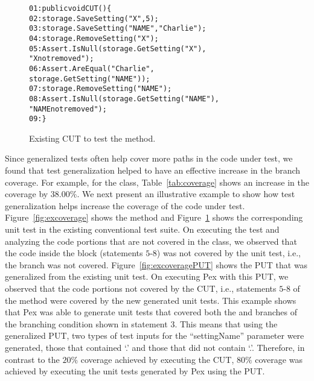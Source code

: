 \begin{figure}[t]
\begin{CodeOut}
\begin{alltt}
01: public void CUT() \{
02: \hspace*{0.07in}storage.SaveSetting("X",5);
03: \hspace*{0.07in}storage.SaveSetting("NAME","Charlie");
04: \hspace*{0.07in}storage.RemoveSetting("X");
05: \hspace*{0.07in}Assert.IsNull(storage.GetSetting("X"),
\hspace*{1.0in}"X not removed");
06: \hspace*{0.07in}Assert.AreEqual("Charlie", 
\hspace{1.0in}storage.GetSetting( "NAME" ) );
07: \hspace*{0.07in}storage.RemoveSetting("NAME");
08: \hspace*{0.07in}Assert.IsNull( storage.GetSetting("NAME"), 
\hspace*{1.8in}"NAME not removed" ); 
09: \hspace*{0.02in}\}
\end{alltt}
\end{CodeOut}  \vspace*{-3ex}
\caption{Existing CUT to test the  method.} \vspace*{-2ex}
\label{fig:excoveragetest}%
\end{figure}

Since generalized tests often help cover more paths in the code under test, we found that test generalization helped to have an effective increase in the branch coverage. For example, for the  class, Table~\ref{tab:coverage} shows an increase in the coverage by $38.00\%$. We next present an illustrative example to show how test generalization helps increase the coverage of the code under test. Figure~\ref{fig:excoverage} shows the  method and Figure~\ref{fig:excoveragetest} shows the corresponding unit test in the existing conventional test suite. On executing the test and analyzing the code portions that are not covered in the  class, we observed that the code inside the  block (statements $5$-$8$) was not covered by the unit test, i.e., the  branch was not covered. Figure~\ref{fig:excoveragePUT} shows the PUT that was generalized from the existing unit test. On executing Pex with this PUT, we observed that the code portions not covered by the CUT, i.e., statements $5$-$8$ of the  method were covered by the new generated unit tests. This example shows that Pex was able to generate unit tests that covered both the  and  branches of the branching condition shown in statement $3$. This means that using the generalized PUT, two types of test inputs for the ``settingName'' parameter were generated, those that contained `.' and those that did not contain `.'. Therefore, in contrast to the $20\%$ coverage achieved by executing the CUT, $80\%$ coverage was achieved by executing the unit tests generated by Pex using the PUT. 

